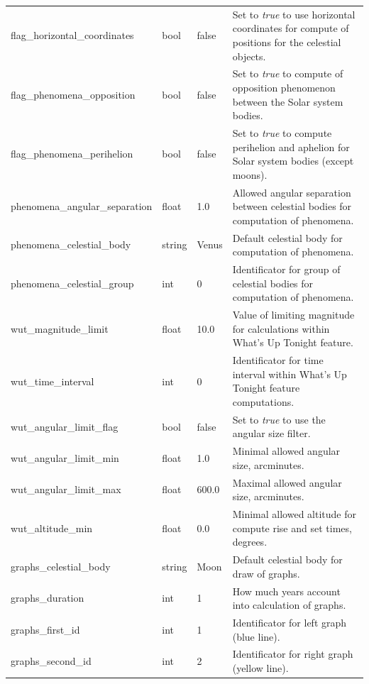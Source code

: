 \begin{longtable}{l|l|l|p{65mm}}
flag\_horizontal\_coordinates  & bool   & false & Set to \emph{true} to use horizontal coordinates for compute of positions for the celestial objects.\\%
flag\_phenomena\_opposition    & bool   & false & Set to \emph{true} to compute of opposition phenomenon between the Solar system bodies.\\%
flag\_phenomena\_perihelion    & bool   & false & Set to \emph{true} to compute perihelion and aphelion for Solar system bodies (except moons).\\%
phenomena\_angular\_separation & float  & 1.0   & Allowed angular separation between celestial bodies for computation of phenomena.\\%
phenomena\_celestial\_body     & string & Venus & Default celestial body for computation of phenomena.\\%
phenomena\_celestial\_group    & int    & 0     & Identificator for group of celestial bodies for computation of phenomena.\\%
wut\_magnitude\_limit          & float  & 10.0  & Value of limiting magnitude for calculations within What's Up Tonight feature.\\%
wut\_time\_interval            & int    & 0     & Identificator for time interval within What's Up Tonight feature computations.\\%
wut\_angular\_limit\_flag      & bool   & false & Set to \emph{true} to use the angular size filter.\\%
wut\_angular\_limit\_min       & float  & 1.0   & Minimal allowed angular size, arcminutes.\\%
wut\_angular\_limit\_max       & float  & 600.0 & Maximal allowed angular size, arcminutes.\\%
wut\_altitude\_min             & float  & 0.0   & Minimal allowed altitude for compute rise and set times, degrees.\\%
graphs\_celestial\_body        & string & Moon  & Default celestial body for draw of graphs.\\%
graphs\_duration               & int    & 1     & How much years account into calculation of graphs.\\%
graphs\_first\_id              & int    & 1     & Identificator for left graph (blue line).\\%
graphs\_second\_id             & int    & 2     & Identificator for right graph (yellow line).\\\bottomrule
\end{longtable}

